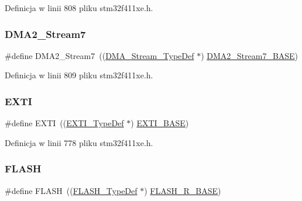 Definicja w linii 808 pliku stm32f411xe.\+h.

\mbox{\label{group___peripheral__declaration_gacc135dbca0eca67d5aa0abc555f053ce}} 
\subsubsection{\texorpdfstring{D\+M\+A2\+\_\+\+Stream7}{DMA2\_Stream7}}
{\footnotesize\ttfamily \#define D\+M\+A2\+\_\+\+Stream7~((\hyperlink{struct_d_m_a___stream___type_def}{D\+M\+A\+\_\+\+Stream\+\_\+\+Type\+Def} $\ast$) \hyperlink{group___peripheral__memory__map_gaa9faa708ad2440d24eb1064cba9bb06d}{D\+M\+A2\+\_\+\+Stream7\+\_\+\+B\+A\+SE})}



Definicja w linii 809 pliku stm32f411xe.\+h.

\mbox{\label{group___peripheral__declaration_ga9189e770cd9b63dadd36683eb9843cac}} 
\subsubsection{\texorpdfstring{E\+X\+TI}{EXTI}}
{\footnotesize\ttfamily \#define E\+X\+TI~((\hyperlink{struct_e_x_t_i___type_def}{E\+X\+T\+I\+\_\+\+Type\+Def} $\ast$) \hyperlink{group___peripheral__memory__map_ga87371508b3bcdcd98cd1ec629be29061}{E\+X\+T\+I\+\_\+\+B\+A\+SE})}



Definicja w linii 778 pliku stm32f411xe.\+h.

\mbox{\label{group___peripheral__declaration_ga844ea28ba1e0a5a0e497f16b61ea306b}} 
\subsubsection{\texorpdfstring{F\+L\+A\+SH}{FLASH}}
{\footnotesize\ttfamily \#define F\+L\+A\+SH~((\hyperlink{struct_f_l_a_s_h___type_def}{F\+L\+A\+S\+H\+\_\+\+Type\+Def} $\ast$) \hyperlink{group___peripheral__memory__map_ga8e21f4845015730c5731763169ec0e9b}{F\+L\+A\+S\+H\+\_\+\+R\+\_\+\+B\+A\+SE})}



